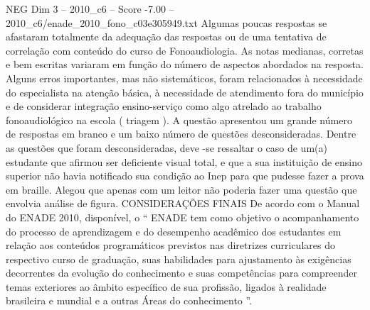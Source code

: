 \begin{textsample}{NEG Dim 3 – 2010\_c6 – Score -7.00 – 2010\_c6/enade\_2010\_fono\_c03e305949.txt}
Algumas poucas respostas se afastaram totalmente da adequação das respostas ou de uma tentativa de correlação com conteúdo do curso de Fonoaudiologia.
As notas medianas, corretas e bem escritas variaram em função do número de aspectos abordados na resposta.
Alguns erros importantes, mas não sistemáticos, foram relacionados à necessidade do especialista na atenção básica, à necessidade de atendimento fora do município e de considerar integração ensino-serviço como algo atrelado ao trabalho fonoaudiológico na escola ( triagem ).
A questão apresentou um grande número de respostas em branco e um baixo número de questões desconsideradas.
Dentre as questões que foram desconsideradas, deve -se ressaltar o caso de um(a) estudante que afirmou ser deficiente visual total, e que a sua instituição de ensino superior não havia notificado sua condição ao Inep para que pudesse fazer a prova em braille.
Alegou que apenas com um leitor não poderia fazer uma questão que envolvia análise de figura.
CONSIDERAÇÕES FINAIS De acordo com o Manual do ENADE 2010, disponível, o “ ENADE tem como objetivo o acompanhamento do processo de aprendizagem e do desempenho acadêmico dos estudantes em relação aos conteúdos programáticos previstos nas diretrizes curriculares do respectivo curso de graduação, suas habilidades para ajustamento às exigências decorrentes da evolução do conhecimento e suas competências para compreender temas exteriores ao âmbito específico de sua profissão, ligados à realidade brasileira e mundial e a outras Áreas do conhecimento ”.

\end{textsample}
